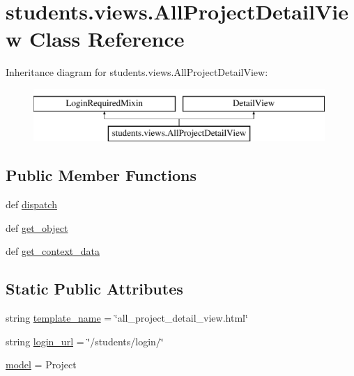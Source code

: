 \hypertarget{classstudents_1_1views_1_1_all_project_detail_view}{\section{students.\-views.\-All\-Project\-Detail\-View Class Reference}
\label{classstudents_1_1views_1_1_all_project_detail_view}
}
Inheritance diagram for students.\-views.\-All\-Project\-Detail\-View\-:\begin{figure}[H]
\begin{center}
\leavevmode
\includegraphics[height=2.000000cm]{classstudents_1_1views_1_1_all_project_detail_view}
\end{center}
\end{figure}
\subsection*{Public Member Functions}
\begin{DoxyCompactItemize}
\item 
def \hyperlink{classstudents_1_1views_1_1_all_project_detail_view_ab4579ea6b73991a980aaf7d0d7e373e8}{dispatch}
\item 
def \hyperlink{classstudents_1_1views_1_1_all_project_detail_view_a501ce935af27d501442b472b27c71bda}{get\-\_\-object}
\item 
def \hyperlink{classstudents_1_1views_1_1_all_project_detail_view_ae9bf8cd5bb54a5b7071c273aaf2cae53}{get\-\_\-context\-\_\-data}
\end{DoxyCompactItemize}
\subsection*{Static Public Attributes}
\begin{DoxyCompactItemize}
\item 
string \hyperlink{classstudents_1_1views_1_1_all_project_detail_view_a6455b90d3855458abb8d369c26322c29}{template\-\_\-name} = \char`\"{}all\-\_\-project\-\_\-detail\-\_\-view.\-html\char`\"{}
\item 
string \hyperlink{classstudents_1_1views_1_1_all_project_detail_view_a58608f95af2ecd53269734a03d805f3f}{login\-\_\-url} = \char`\"{}/students/login/\char`\"{}
\item 
\hyperlink{classstudents_1_1views_1_1_all_project_detail_view_a4cfc7df6cba375623235cb90098767d9}{model} = Project
\end{DoxyCompactItemize}


